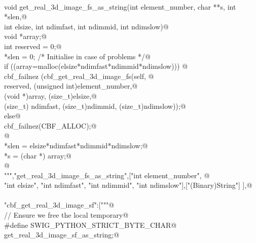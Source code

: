 \documentclass[10pt,a4paper,twoside,notitlepage]{article}
\begin{document}
\begin{flushleft}
\begin{minipage}{\linewidth}
\begin{list}{}{}
\mbox{}\verb@@\\
\mbox{}\verb@    void get_real_3d_image_fs_as_string(int element_number, char **s, int *slen,@\\
\mbox{}\verb@    int elsize, int ndimfast, int ndimmid, int ndimslow){@\\
\mbox{}\verb@        void *array;@\\
\mbox{}\verb@        int reserved = 0;@\\
\mbox{}\verb@        *slen = 0; /* Initialise in case of problems */@\\
\mbox{}\verb@        if ((array=malloc(elsize*ndimfast*ndimmid*ndimslow))) {@\\
\mbox{}\verb@               cbf_failnez (cbf_get_real_3d_image_fs(self, @\\
\mbox{}\verb@               reserved, (unsigned int)element_number,@\\
\mbox{}\verb@               (void *)array, (size_t)elsize,@\\
\mbox{}\verb@               (size_t) ndimfast, (size_t)ndimmid, (size_t)ndimslow));@\\
\mbox{}\verb@         }else{@\\
\mbox{}\verb@               cbf_failnez(CBF_ALLOC);@\\
\mbox{}\verb@         }@\\
\mbox{}\verb@        *slen = elsize*ndimfast*ndimmid*ndimslow;@\\
\mbox{}\verb@        *s = (char *) array;@\\
\mbox{}\verb@      }@\\
\mbox{}\verb@""","get_real_3d_image_fs_as_string",["int element_number", @\\
\mbox{}\verb@    "int elsize", "int ndimfast", "int ndimmid", "int ndimslow"],["(Binary)String"] ],@\\
\mbox{}\verb@@\\
\mbox{}\verb@"cbf_get_real_3d_image_sf":["""@\\
\mbox{}\verb@// Ensure we free the local temporary@\\
\mbox{}\verb@%{@\\
\mbox{}\verb@#define SWIG_PYTHON_STRICT_BYTE_CHAR@\\
\mbox{}\verb@%}@\\
\mbox{}\verb@%cstring_output_allocate_size(char ** s, int *slen, free(*$1))@\\
\mbox{}\verb@       get_real_3d_image_sf_as_string;@\\
\mbox{}\verb@@\\

\end{list}
\end{minipage}
\end{flushleft}
\end{document}
